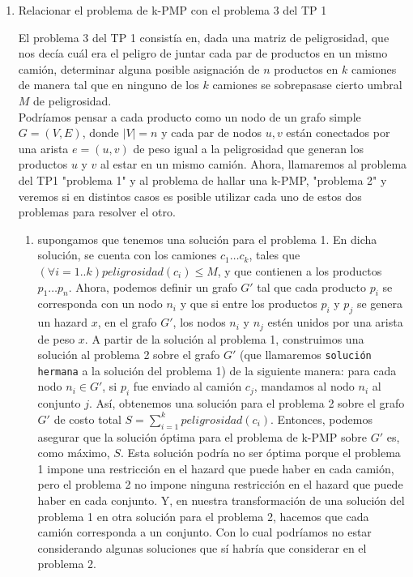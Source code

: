 \documentclass[11pt, a4paper, twoside]{article}
\begin{document}
		\begin{enumerate}
			 \item Relacionar el problema de k-PMP con el problema 3 del TP 1
			 
			  El problema 3 del TP 1 consistía en, dada una matriz de peligrosidad, que 
			  nos decía cuál era
			  el peligro de juntar cada par de productos en un mismo camión,  determinar alguna
			  posible asignación de $n$ productos en $k$ camiones de manera tal que en ninguno
			  de los $k$ camiones se sobrepasase cierto umbral $M$ de peligrosidad. \\
			  Podríamos pensar a cada producto como un nodo de un grafo simple $G = (V,E)$, donde 
			  $|V| = n$ y cada par de nodos $u,v$ están conectados por una arista $e = (u,v)$ de
			  peso igual a la peligrosidad que generan los productos $u$ y $v$ al estar en un
			  mismo camión. Ahora, llamaremos al problema del TP1 "problema 1" y al problema de hallar
			  una k-PMP, "problema 2" y veremos si en distintos casos es posible utilizar cada uno 
			  de estos dos problemas para resolver el otro.
			  \begin{enumerate}
			      \item supongamos que tenemos una solución para el problema 1. En dicha solución, se
			      cuenta con los camiones $c_{1} \dots c_{k}$, tales que $(\forall i=1..k) 
			      peligrosidad(c_{i}) \leq M$, y que contienen a los productos $p_{1} \dots p_{n}$. 
			      Ahora, podemos definir un grafo $G'$ tal que cada producto $p_{i}$ se corresponda
			      con un nodo $n_{i}$ y que si entre los productos $p_{i}$ y $p_{j}$ se genera un hazard $x$, en 
			      el grafo $G'$, los nodos $n_{i}$ y $n_{j}$ estén unidos por una arista de peso $x$. A partir de 
			      la solución al problema 1, construimos una solución al problema 2 sobre el grafo $G'$ (que llamaremos
			      \texttt{solución hermana} a la solución del problema 1) de la 
			      siguiente manera: para cada nodo $n_{i} \in G'$, si $p_{i}$ fue enviado al camión $c_{j}$, mandamos
			      al nodo $n_{i}$ al conjunto $j$. Así, obtenemos una solución para el problema 2 sobre el grafo
			      $G'$ de costo total $S = \sum\limits_{i=1}^k peligrosidad(c_{i})$. Entonces, podemos asegurar que
			      la solución óptima para el problema de k-PMP sobre $G'$ es, como máximo, $S$. Esta solución
			      podría no ser óptima porque el problema 1 impone una restricción en el hazard que puede 
			      haber en cada camión, pero el problema 2 no impone ninguna restricción en el hazard que puede haber
			      en cada conjunto. Y, en nuestra transformación de una solución del problema 1 en otra solución para
			      el problema 2, hacemos que cada camión corresponda a un conjunto. Con lo cual podríamos no estar
			      considerando algunas soluciones que sí habría que considerar en el problema 2.
			      

\end{enumerate}
\end{enumerate}
\end{document}
